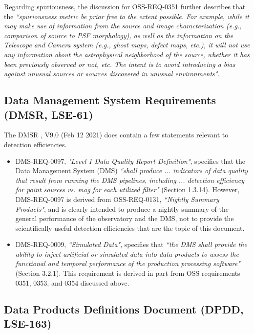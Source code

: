 Regarding spuriousness, the discussion for OSS-REQ-0351 further describes that the {\it ``spuriousness metric be prior free to the extent possible. For example, while it may make use of information from the source and image characterization (e.g., comparison of source to PSF morphology), as well as the information on the Telescope and Camera system (e.g., ghost maps, defect maps, etc.), it will not use any information about the astrophysical neighborhood of the source, whether it has been previously observed or not, etc. The intent is to avoid introducing a bias against unusual sources or sources discovered in unusual environments"}.


\subsection{Data Management System Requirements (DMSR, LSE-61)}\label{ssec:docs_dmsr}

The DMSR , V9.0 (Feb 12 2021) does contain a few statements relevant to detection efficiencies. 

\begin{itemize}

\item DMS-REQ-0097, {\it "Level 1 Data Quality Report Definition"}, specifies that the Data Management System (DMS) {\it ``shall produce ... indicators of data quality that result from running the DMS pipelines, including ... detection efficiency for point sources vs. mag for each utilized filter"} (Section 1.3.14).
However, DMS-REQ-0097 is derived from OSS-REQ-0131, {\it ``Nightly Summary Products"}, and is clearly intended to produce a nightly summary of the general performance of the observatory and the DMS, not to provide the scientifically useful detection efficiencies that are the topic of this document. 

\item DMS-REQ-0009, {\it ``Simulated Data"}, specifies that {\it ``the DMS shall provide the ability to inject artificial or simulated data into data products to assess the functional and temporal performance of the production processing software"} (Section 3.2.1).
This requirement is derived in part from OSS requirements 0351, 0353, and 0354 discussed above.

\end{itemize}


\subsection{Data Products Definitions Document (DPDD, LSE-163)}\label{ssec:docs_dpdd}

